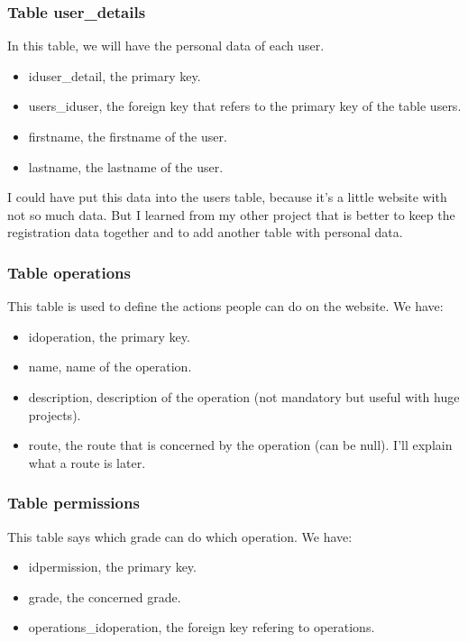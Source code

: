 \documentclass[12pt,a4paper,openany]{book}
\begin{document}
\subsubsection{Table user\_details}
In this table, we will have the personal data of each user.
\begin{itemize}
	\item iduser\_detail, the primary key.
	\item users\_iduser, the foreign key that refers to the primary key of the table users.
	\item firstname, the firstname of the user.
	\item lastname, the lastname of the user.
\end{itemize}
\begin{remarque}
	I could have put this data into the users table, because it's a little website with not so much data. But I learned from my other project that is better to keep the registration data together and to add another table with personal data.
\end{remarque}

\subsubsection{Table operations}
This table is used to define the actions people can do on the website. We have:
\begin{itemize}
	\item idoperation, the primary key.
	\item name, name of the operation.
	\item description, description of the operation (not mandatory but useful with huge projects).
	\item route, the route that is concerned by the operation (can be null). I'll explain what a route is later.
\end{itemize}

\subsubsection{Table permissions}
This table says which grade can do which operation. We have:
\begin{itemize}
	\item idpermission, the primary key.
	\item grade, the concerned grade.
	\item operations\_idoperation, the foreign key refering to operations.
\end{itemize}
\end{document}
